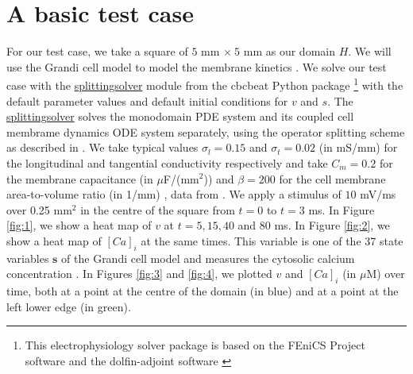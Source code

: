 \documentclass[12pt,a4paper]{article}
\begin{document}
\section{A basic test case} \label{A basic test case}
For our test case, we take a square of $5$ mm $\times\: 5$ mm as our domain $H$. We will use the Grandi cell model to model the membrane kinetics \cite{Grandi}. We solve our test case with the \url{splittingsolver} module from the cbcbeat Python package \cite{cbcbeat}\footnote{This electrophysiology solver package is based on the FEniCS Project software \cite{fenics} and the dolfin-adjoint software \cite{dolfin-adjoint}} with the default parameter values and default initial conditions for $v$ and $s$. The \url{splittingsolver} solves the monodomain PDE system and its coupled cell membrame dynamics ODE system separately, using the operator splitting scheme as described in \cite{Sundnes}. We take typical values $\sigma_l=0.15$ and $\sigma_t=0.02$ (in mS/mm) for the longitudinal and tangential conductivity respectively and take $C_m=0.2$ for the membrane capacitance (in $\mu$F/(mm$^2$)) and $\beta=200$ for the cell membrane area-to-volume ratio (in 1/mm) \cite{Roth}, data from \cite{Plonsey1882, Plonsey1984}.
We apply a stimulus of $10$ mV/ms over 0.25 mm$^2$ in the centre of the square from $t=0$ to $t=3$ ms. In Figure \ref{fig:1}, we show a heat map of $v$ at $t=5, 15, 40$ and $80$ ms. In Figure \ref{fig:2}, we show a heat map of $[Ca]_i$ at the same times. This variable is one of the 37 state variables $\mathbf{s}$ of the Grandi cell model and measures the cytosolic calcium concentration \cite{Grandi}. In Figures \ref{fig:3} and \ref{fig:4}, we plotted $v$ and $[Ca]_i$ (in $\mu$M) over time, both at a point at the centre of the domain (in blue) and at a point at the left lower edge (in green).

\end{document}
